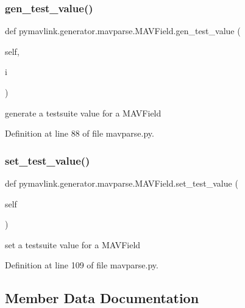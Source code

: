 \subsubsection{\texorpdfstring{gen\_test\_value()}{gen\_test\_value()}}
{\footnotesize\ttfamily def pymavlink.\+generator.\+mavparse.\+M\+A\+V\+Field.\+gen\+\_\+test\+\_\+value (\begin{DoxyParamCaption}\item[{}]{self,  }\item[{}]{i }\end{DoxyParamCaption})}

\begin{DoxyVerb}generate a testsuite value for a MAVField\end{DoxyVerb}
 

Definition at line 88 of file mavparse.\+py.

\mbox{\label{classpymavlink_1_1generator_1_1mavparse_1_1MAVField_a8f6649ad27b22034662c7eea24aba304}} 
\subsubsection{\texorpdfstring{set\_test\_value()}{set\_test\_value()}}
{\footnotesize\ttfamily def pymavlink.\+generator.\+mavparse.\+M\+A\+V\+Field.\+set\+\_\+test\+\_\+value (\begin{DoxyParamCaption}\item[{}]{self }\end{DoxyParamCaption})}

\begin{DoxyVerb}set a testsuite value for a MAVField\end{DoxyVerb}
 

Definition at line 109 of file mavparse.\+py.



\subsection{Member Data Documentation}
\mbox{\label{classpymavlink_1_1generator_1_1mavparse_1_1MAVField_a45f6fb514dad3baeec4adf06f7eadff8}} 
